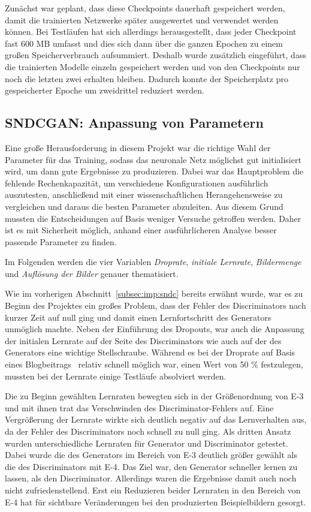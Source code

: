  Zunächst war geplant, dass diese Checkpoints dauerhaft gespeichert werden,
 damit die trainierten Netzwerke später ausgewertet und verwendet werden können.
 Bei Testläufen hat sich allerdings herausgestellt, dass jeder Checkpoint fast
 600 MB umfasst und dies sich dann über die ganzen Epochen zu einem großen
 Speicherverbrauch aufsummiert. Deshalb wurde zusätzlich eingeführt, dass die
 trainierten Modelle einzeln gespeichert werden und von den Checkpoints nur noch
 die letzten zwei erhalten bleiben. Dadurch konnte der Speicherplatz pro
 gespeicherter Epoche um zweidrittel reduziert werden.
 
 \subsection{SNDCGAN: Anpassung von Parametern} %
 
 Eine große Herausforderung in diesem Projekt war die richtige Wahl der
 Parameter für das Training, sodass das neuronale Netz möglichst gut
 initialisiert wird, um dann gute Ergebnisse zu produzieren. Dabei war das
 Hauptproblem die fehlende Rechenkapazität, um verschiedene Konfigurationen
 ausführlich auszutesten, anschließend mit einer wissenschaftlichen
 Herangehensweise zu vergleichen und daraus die besten Parameter abzuleiten. Aus
 diesem Grund mussten die Entscheidungen auf Basis weniger Versuche getroffen
 werden. Daher ist es mit Sicherheit möglich, anhand einer ausführlicheren
 Analyse besser passende Parameter zu finden.
 
 Im Folgenden werden die vier Variablen \emph{Droprate}, \emph{initiale
 Lernrate}, \emph{Bildermenge} und \emph{Auflösung der Bilder} genauer
 thematisiert.
 
 Wie im vorherigen Abschnitt~\ref{subsec:imp:sndc} bereits erwähnt wurde, war es
 zu Beginn des Projektes ein großes Problem, dass der Fehler des Discriminators
 nach kurzer Zeit auf null ging und damit einen Lernfortschritt des Generators
 unmöglich machte. Neben der Einführung des Dropouts, war auch die Anpassung der
 initialen Lernrate auf der Seite des Discriminators wie auch auf der des
 Generators eine wichtige Stellschraube. Während es bei der Droprate auf Basis
 eines Blogbeitrags~\cite{brownlee2019} relativ schnell möglich war, einen Wert
 von 50 \% festzulegen, mussten bei der Lernrate einige Testläufe absolviert
 werden. 
 
 Die zu Beginn gewählten Lernraten bewegten sich in der Größenordnung von E-3
 und mit ihnen trat das Verschwinden des Discriminator-Fehlers auf. Eine
 Vergrößerung der Lernrate wirkte sich deutlich negativ auf das Lernverhalten
 aus, da der Fehler des Discriminators noch schnell zu null ging. Als dritten
 Ansatz wurden unterschiedliche Lernraten für Generator und Discriminator
 getestet. Dabei wurde die des Generators im Bereich von E-3 deutlich größer
 gewählt als die des Discriminators mit E-4. Das Ziel war, den Generator
 schneller lernen zu lassen, als den Discriminator. Allerdings waren die
 Ergebnisse damit auch noch nicht zufriedenstellend. Erst ein Reduzieren beider
 Lernraten in den Bereich von E-4 hat für sichtbare Veränderungen bei den
 produzierten Beispielbildern gesorgt.
 
